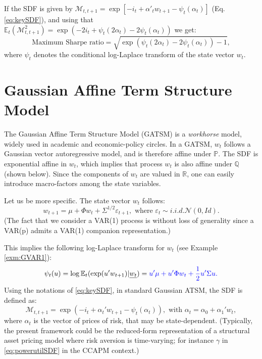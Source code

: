 \documentclass[
  12pt,
]{book}
\theoremstyle{definition}
\theoremstyle{definition}
\theoremstyle{definition}
\theoremstyle{definition}
\theoremstyle{remark}
\begin{document}
If the SDF is given by \(\mathcal{M}_{t,t+1} = \exp[-i_{t}+\alpha'_tw_{t+1}-\psi_t(\alpha_t)]\) (Eq. \eqref{eq:keySDF}), and using that \(\mathbb{E}_t(\mathcal{M}_{t,t+1}^2)=\exp(-2i_t+\psi_t(2\alpha_t)-2\psi_t(\alpha_t))\) we get:
\[
\mbox{Maximum Sharpe ratio} = \sqrt{\exp(\psi_t(2\alpha_t)-2\psi_t(\alpha_t)) - 1},
\]
where \(\psi_t\) denotes the conditional log-Laplace transform of the state vector \(w_t\).

\hypertarget{RiskFreeGaussian}{%
\section{Gaussian Affine Term Structure Model}\label{RiskFreeGaussian}}

The Gaussian Affine Term Structure Model (GATSM) is a \emph{workhorse} model, widely used in academic and economic-policy circles. In a GATSM, \(w_t\) follows a Gaussian vector autoregressive model, and is therefore affine under \(\mathbb{P}\). The SDF is exponential affine in \(w_t\), which implies that process \(w_t\) is also affine under \(\mathbb{Q}\) (shown below). Since the components of \(w_t\) are valued in \(\mathbb{R}\), one can easily introduce macro-factors among the state variables.

Let us be more specific. The state vector \(w_t\) follows:
\begin{equation}
w_{t+1} = \mu + \Phi w_{t} + \Sigma^{1/2} \varepsilon_{t+1}, \mbox{ where } \varepsilon_{t} \sim  i.i.d. \mathcal{N}(0,Id).\label{eq:GaussianVAR1}
\end{equation}
(The fact that we consider a VAR(1) process is without loss of generality since a VAR(p) admits a VAR(1) companion representation.)

This implies the following log-Laplace transform for \(w_t\) (see Example \ref{exm:GVAR1}):
\begin{equation}
\psi_t(u) = \log \mathbb{E}_t(\exp(u'w_{t+1})|\underline{w_t}) = \color{blue}{u'\mu + u'\Phi w_t + \frac{1}{2}u'\Sigma u}.\label{eq:logLTGaussian}
\end{equation}
Using the notations of \eqref{eq:keySDF}, in standard Gaussian ATSM, the SDF is defined as:
\[
\mathcal{M}_{t,t+1} = \exp(- i_t + \alpha_t'w_{t+1} - \psi_t(\alpha_t)), \mbox{ with } \alpha_t = \alpha_0 + \alpha_1'w_t,
\]
where \(\alpha_t\) is the vector of prices of risk, that may be state-dependent. (Typically, the present framework could be the reduced-form representation of a structural asset pricing model where risk aversion is time-varying; for instance \(\gamma\) in \eqref{eq:powerutilSDF} in the CCAPM context.)
\end{document}
